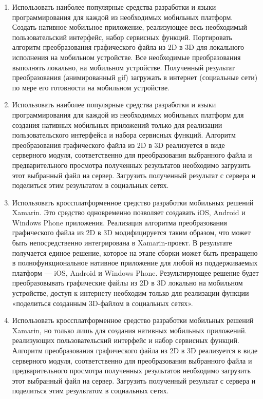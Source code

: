 \begin{enumerate}
	\item Использовать наиболее популярные средства разработки и языки программирования для каждой из необходимых мобильных платформ. Создать нативное мобильное приложение, реализующее весь необходимый пользовательский интерфейс, набор сервисных функций. Портировать алгоритм преобразования графического файла из 2D в 3D для локального исполнения на мобильном устройстве. Все необходимые преобразования выполнять локально, на мобильном устройстве. Полученный результат преобразования (анимированный gif) загружать в интернет (социальные сети) по мере его готовности на мобильном устройстве.
	\item Использовать наиболее популярные средства разработки и языки программирования для каждой из необходимых мобильных платформ для создания нативных мобильных приложений только для реализации пользовательского интерфейса и набора сервисных функций. Алгоритм преобразования графического файла из 2D в 3D реализуется в виде серверного модуля, соответственно для преобразования выбранного файла и предварительного просмотра полученных результатов необходимо загрузить этот выбранный файл на сервер. Загрузить полученный результат с сервера и поделиться этим результатом в социальных сетях.
	\item Использовать кроссплатформенное средство разработки мобильных решений Xamarin. Это средство одновременно позволяет создавать iOS, Android и Windows Phone приложения. Реализация алгоритма преобразования графического файла из 2D в 3D модифицируется таким образом, что может быть непосредственно интегрирована в Xamarin-проект. В результате получается единое решение, которое на этапе сборки может быть превращено в полнофункциональное нативное приложение для любой из поддерживаемых платформ --- iOS, Android и Windows Phone. Результирующее решение будет преобразовывать графические файлы из 2D в 3D локально на мобильном устройстве, доступ к интернету необходим только для реализации функции «поделиться созданным 3D-файлом в социальных сетях».
	\item Использовать кроссплатформенное средство разработки мобильных решений Xamarin, но только лишь для создания нативных мобильных приложений. реализующих пользовательский интерфейс и набор сервисных функций. Алгоритм преобразования графического файла из 2D в 3D реализуется в виде серверного модуля, соответственно для преобразования выбранного файла и предварительного просмотра полученных результатов необходимо загрузить этот выбранный файл на сервер. Загрузить полученный результат с сервера и поделиться этим результатом в социальных сетях.
\end{enumerate}

